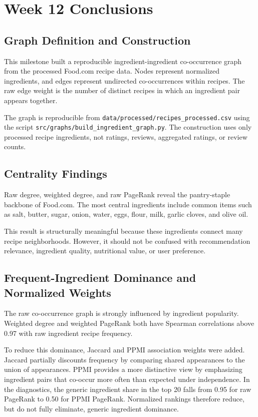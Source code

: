\documentclass[11pt,a4paper]{article}
\begin{document}
\section{Week 12 Conclusions}

\subsection{Graph Definition and Construction}
This milestone built a reproducible ingredient-ingredient co-occurrence graph from the processed Food.com recipe data. Nodes represent normalized ingredients, and edges represent undirected co-occurrences within recipes. The raw edge weight is the number of distinct recipes in which an ingredient pair appears together.

The graph is reproducible from \texttt{data/processed/recipes\_processed.csv} using the script \texttt{src/graphs/build\_ingredient\_graph.py}. The construction uses only processed recipe ingredients, not ratings, reviews, aggregated ratings, or review counts.

\subsection{Centrality Findings}
Raw degree, weighted degree, and raw PageRank reveal the pantry-staple backbone of Food.com. The most central ingredients include common items such as salt, butter, sugar, onion, water, eggs, flour, milk, garlic cloves, and olive oil.

This result is structurally meaningful because these ingredients connect many recipe neighborhoods. However, it should not be confused with recommendation relevance, ingredient quality, nutritional value, or user preference.

\subsection{Frequent-Ingredient Dominance and Normalized Weights}
The raw co-occurrence graph is strongly influenced by ingredient popularity. Weighted degree and weighted PageRank both have Spearman correlations above 0.97 with raw ingredient recipe frequency.

To reduce this dominance, Jaccard and PPMI association weights were added. Jaccard partially discounts frequency by comparing shared appearances to the union of appearances. PPMI provides a more distinctive view by emphasizing ingredient pairs that co-occur more often than expected under independence. In the diagnostics, the generic ingredient share in the top 20 falls from 0.95 for raw PageRank to 0.50 for PPMI PageRank. Normalized rankings therefore reduce, but do not fully eliminate, generic ingredient dominance.
\end{document}
